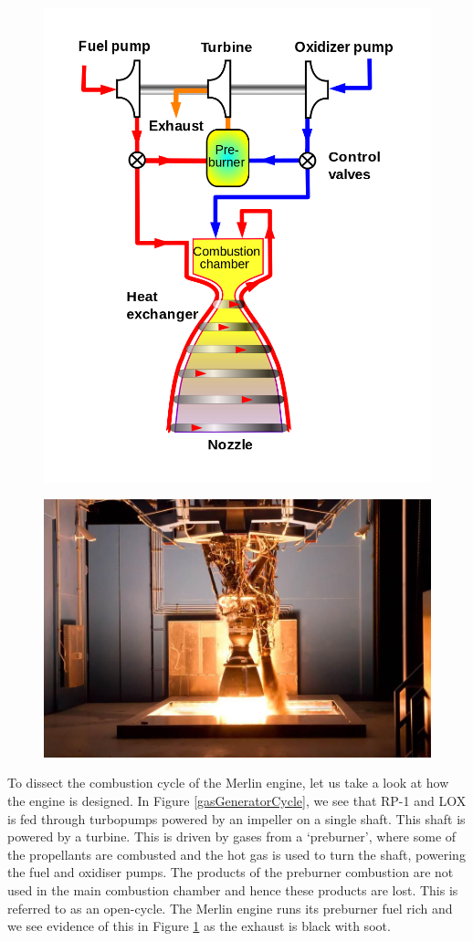 \documentclass[11pt]{article}
\numberwithin{equation}{section}
\begin{document}
\begin{figure}[H]
    \centering
    \begin{minipage}{.5\textwidth}
        \centering
        \includegraphics[height = 25ex]{./img/openCycle.png}
        \label{gasGeneratorCycle}
    \end{minipage}%
    \begin{minipage}{.5\textwidth}
        \centering
        \includegraphics[height = 25ex]{./img/merlinTest.jpg}
        \label{merlinTest}
    \end{minipage}
\end{figure}

To dissect the combustion cycle of the Merlin engine, let us take a look at how the engine is designed. In Figure \ref{gasGeneratorCycle}, we see that RP-1 and LOX is fed through turbopumps powered by an impeller on a single shaft. This shaft is powered by a turbine. This is driven by gases from a `preburner', where some of the propellants are combusted and the hot gas is used to turn the shaft, powering the fuel and oxidiser pumps. The products of the preburner combustion are not used in the main combustion chamber and hence these products are lost. This is referred to as an open-cycle. The Merlin engine runs its preburner fuel rich and we see evidence of this in Figure \ref{merlinTest} as the exhaust is black with soot.
\end{document}
